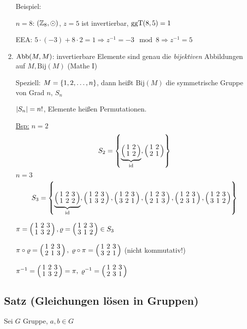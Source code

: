 \begin{enumerate}
	Beispiel:
	
	$n=8$: $(\mathbb{Z}_8, \odot)$, $z=5$ ist invertierbar, $\mathrm{ ggT }(8, 5) = 1$
	
	EEA: $5 \cdot (-3) + 8 \cdot 2 = 1 \Rightarrow z^{-1} = -3 \mod 8 \Rightarrow z^{-1} = 5$


	\item
	$\mathrm{ Abb }(M, M)$: invertierbare Elemente sind genau die \emph{bijektiven} Abbildungen auf $M, \mathrm{Bij}(M)$ (Mathe I)
	
	Speziell: $M = \left\{1, 2, \dots, n\right\}$, dann heißt $\mathrm{Bij}(M)$ die symmetrische Gruppe von Grad $n$, $S_n$
	
	$\left|S_n\right| = n!$, Elemente heißen Permutationen.
	
	\underline{Bsp:} $n=2$
	\[S_2= \aset{
	\underbrace{\aMatrix{cc}{
	1 & 2 \\ 
	1 & 2}}_{\id},
	\aMatrix{cc}{
	1 & 2 \\
	2 & 1}}\]
	$n=3$
	\[S_3 = \aset{
	\underbrace{\sPer{1}{2}{2}}_{\id},
	\sPer{1}{3}{2},
	\sPer{3}{2}{1},
	\sPer{2}{1}{3},
	\sPer{2}{3}{1},
	\sPer{3}{1}{2}
	}\]
	
	$\pi = \sPer{1}{3}{2}, \varrho = \sPer{3}{1}{2} \in S_3$
	
	$\pi \circ \varrho = \sPer{2}{1}{3},\; \varrho \circ \pi = \sPer{3}{2}{1}$ (nicht kommutativ!)
	
	$\pi^{-1} = \sPer{1}{3}{2} = \pi,\; \varrho^{-1}= \sPer{2}{3}{1}$
\end{enumerate}

\subsection[Satz: Gleichungen lösen in Gruppen]{Satz (Gleichungen lösen in Gruppen)} \label{gLösenGruppen}

	Sei $G$ Gruppe, $a, b \in G$
	
